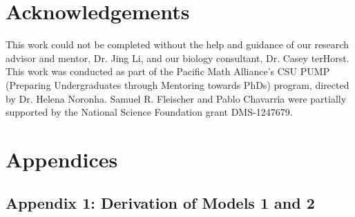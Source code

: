 \documentclass{amsart}
\theoremstyle{definition}
\theoremstyle{remark}
\numberwithin{equation}{section}
\begin{document}
\FloatBarrier
\pagebreak
\section*{Acknowledgements}
This work could not be completed without the help and guidance of our research advisor and mentor, Dr. Jing Li, and our biology consultant, Dr. Casey terHorst.  This work was conducted as part of the Pacific Math Alliance's CSU PUMP (Preparing Undergraduates through Mentoring towards PhDs) program, directed by Dr. Helena Noronha.  Samuel R. Fleischer and Pablo Chavarria were partially supported by the National Science Foundation grant DMS-1247679.






























\FloatBarrier
\pagebreak
\section*{Appendices}
\subsection*{Appendix 1: Derivation of Models 1 and 2}
\end{document}

